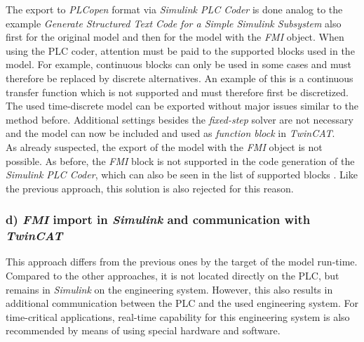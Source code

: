     The export to \textit{PLCopen} format via \textit{Simulink PLC Coder} is done analog to the example \textit{Generate Structured Text Code for a Simple Simulink Subsystem} \cite{SimulinkPlcCoderExample} also first for the original model and then for the model with the \textit{FMI} object. When using the PLC coder, attention must be paid to the supported blocks used in the model. For example, continuous blocks can only be used in some cases and must therefore be replaced by discrete alternatives. An example of this is a continuous transfer function which is not supported and must therefore first be discretized. \\
    
    The used time-discrete model can be exported without major issues similar to the method before. Additional settings besides the \textit{fixed-step} solver are not necessary and the model can now be included and used as \textit{function block} in \textit{TwinCAT}. \\
    As already suspected, the export of the model with the \textit{FMI} object is not possible. As before, the \textit{FMI} block is not supported in the code generation of the \textit{Simulink PLC Coder}, which can also be seen in the list of supported blocks \cite{SimulinkPlcCoderSupportedBlocks}. Like the previous approach, this solution is also rejected for this reason. 
    
\subsubsection{d) \textit{FMI} import in \textit{Simulink} and communication with \textit{TwinCAT}}
    This approach differs from the previous ones by the target of the model run-time. Compared to the other approaches, it is not located directly on the PLC, but remains in \textit{Simulink} on the engineering system. However, this also results in additional communication between the PLC and the used engineering system. For time-critical applications, real-time capability for this engineering system is also recommended by means of using special hardware and software. \\
    

